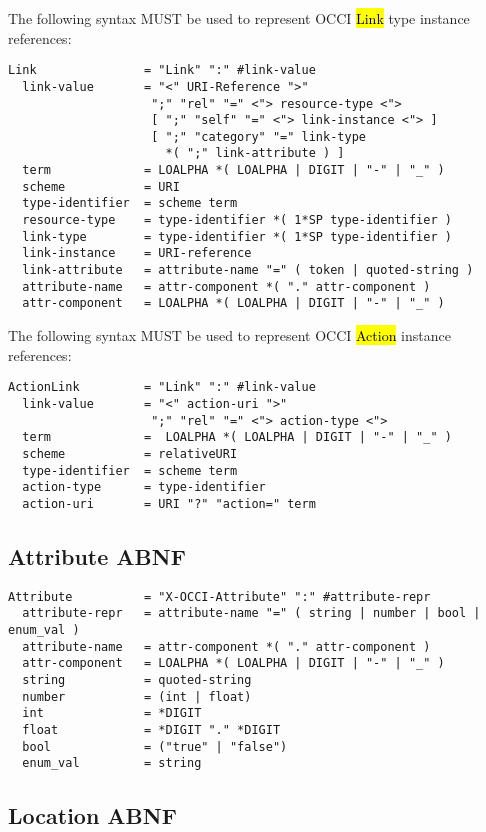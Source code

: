 \documentclass[10pt,a4paper]{article}
\begin{document}
The following syntax MUST be used to represent OCCI \hl{Link} type
instance references:

\begin{verbatim}
Link               = "Link" ":" #link-value
  link-value       = "<" URI-Reference ">"
                    ";" "rel" "=" <"> resource-type <">
                    [ ";" "self" "=" <"> link-instance <"> ]
                    [ ";" "category" "=" link-type
                      *( ";" link-attribute ) ]
  term             = LOALPHA *( LOALPHA | DIGIT | "-" | "_" )
  scheme           = URI
  type-identifier  = scheme term
  resource-type    = type-identifier *( 1*SP type-identifier )
  link-type        = type-identifier *( 1*SP type-identifier )
  link-instance    = URI-reference
  link-attribute   = attribute-name "=" ( token | quoted-string )
  attribute-name   = attr-component *( "." attr-component )
  attr-component   = LOALPHA *( LOALPHA | DIGIT | "-" | "_" )
\end{verbatim}

The following syntax MUST be used to represent OCCI \hl{Action}
instance references:

\begin{verbatim}
ActionLink         = "Link" ":" #link-value
  link-value       = "<" action-uri ">"
                    ";" "rel" "=" <"> action-type <">
  term             =  LOALPHA *( LOALPHA | DIGIT | "-" | "_" )
  scheme           = relativeURI
  type-identifier  = scheme term
  action-type      = type-identifier
  action-uri       = URI "?" "action=" term
\end{verbatim}

\subsection{Attribute ABNF}

\begin{verbatim}
Attribute          = "X-OCCI-Attribute" ":" #attribute-repr
  attribute-repr   = attribute-name "=" ( string | number | bool | enum_val )
  attribute-name   = attr-component *( "." attr-component )
  attr-component   = LOALPHA *( LOALPHA | DIGIT | "-" | "_" )
  string           = quoted-string
  number           = (int | float)
  int              = *DIGIT
  float            = *DIGIT "." *DIGIT
  bool             = ("true" | "false")
  enum_val         = string
\end{verbatim}

\subsection{Location ABNF}
\end{document}
